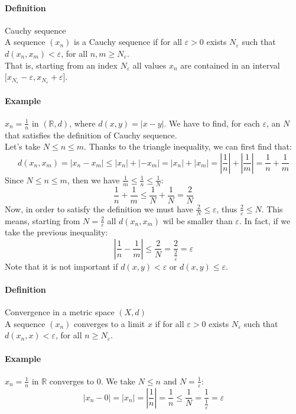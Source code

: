 \documentclass{article}
\newcommand{\abs}[1]{\left|#1\right|}
\newcommand{\R}{\mathbb{R}}
\newcommand{\Ep}{\varepsilon}
\newcommand{\Def}{\paragraph{Definition}}
\newcommand{\Example}{\paragraph{Example}}
\begin{document}
	\Def Cauchy sequence
\\A sequence $(x_n)$ is a Cauchy sequence if for all $\Ep > 0$ exists
	$N_\Ep$ such that $d(x_n,x_m) < \Ep$, for all $n, m \geq N_\Ep$.
\\That is, starting from an index $N_\Ep$ all values $x_n$ are contained in
	an interval ${[}x_{N_\Ep} - \Ep, x_{N_\Ep} + \Ep{]}$.

	\Example $x_n = \frac{1}{n}$ in $(\R, d)$, where $d(x,y) = \abs{x - y}$. We
	have to find, for each $\Ep$, an $N$ that satisfies the definition of
	Cauchy sequence.
\\Let's take $N \leq n \leq m$. Thanks to the triangle inequality, we can first
	find that:
	\begin{equation*}
		d(x_n,x_m) = \abs{x_n - x_m} \leq \abs{x_n} + \abs{-x_m} =
		\abs{x_n} + \abs{x_m} = \abs{\frac{1}{n}} + \abs{\frac{1}{m}} =
		\frac{1}{n} + \frac{1}{m}
	\end{equation*}
	Since $N \leq n \leq m$, then we have $\frac{1}{m} \leq \frac{1}{n} \leq
	\frac{1}{N}$:
	\begin{equation*}
		\frac{1}{n} + \frac{1}{m} \leq
		\frac{1}{N} + \frac{1}{N} = \frac{2}{N}
	\end{equation*}
	Now, in order to satisfy the definition we must have $\frac{2}{N} \leq
	\Ep$, thus $\frac{2}{\Ep} \leq N$. This means, starting from $N =
\frac{2}{\Ep}$ all $d(x_n,x_m)$ wil be smaller than $\Ep$. In fact,
	if we take the previous inequality:
	\begin{equation*}
		\abs{\frac{1}{n} - \frac{1}{m}} \leq
		\frac{2}{N} = \frac{2}{\frac{2}{\Ep}} = \Ep
	\end{equation*}
	Note that it is not important if $d(x,y) < \Ep$ or $d(x,y) \leq \Ep$.

	\Def Convergence in a metric space $(X, d)$
\\A sequence $(x_n)$ converges to a limit $x$ if for all $\Ep > 0$ exists
	$N_\Ep$ such that $d(x_n,x) < \Ep$, for all $n \geq N_\Ep$.

	\Example $x_n = \frac{1}{n}$ in $\R$ converges to 0. We take $N \leq n$ and
	$N = \frac{1}{\Ep}$:
	\begin{equation*}
		\abs{x_n - 0} = \abs{x_n} = \abs{\frac{1}{n}} = \frac{1}{n} \leq \frac{1}{N}
		= \frac{1}{\frac{1}{\Ep}} = \Ep
	\end{equation*}
\end{document}
